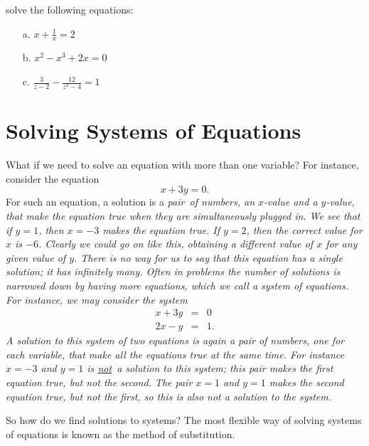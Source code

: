 \begin{question} solve the following equations:
\begin{enumerate}
\item[a.] $x+\frac{1}{x} = 2$ 
\item[b.] $x^2-x^3+2x = 0$
\item[c.] $\frac{3}{z-2} - \frac{12}{z^2-4} = 1$
\end{enumerate}
\end{question}

\section{Solving Systems of Equations}
What if we need to solve an equation with more than one variable? For instance, consider the equation
\[
x+3y  = 0.
\]
For such an equation, a solution is a \it{pair}\ \normalfont of numbers, an $x$-value and a $y$-value, that make the equation true when they are simultaneously plugged in. We see that if $y=1$, then $x=-3$ makes the equation true. If $y=2$, then the correct value for $x$ is $-6$. Clearly we could go on like this, obtaining a different value of $x$ for any given value of $y$. There is no way for us to say that this equation has a single solution; it has infinitely many. Often in problems the number of solutions is narrowed down by having more equations, which we call a \it{system of equations}\normalfont. For instance, we may consider the system
\begin{eqnarray*}
x+3y & = & 0\\
2x-y & = & 1.
\end{eqnarray*}
A solution to this system of two equations is again a pair of numbers, one for each variable, that make all the equations true at the same time. For instance $x=-3$ and $y=1$ is \underline{not}\ \normalfont a solution to this system; this pair makes the first equation true, but not the second. The pair $x=1$ and $y=1$ makes the second equation true, but not the first, so this is also not a solution to the system.

\par 

So how do we find solutions to systems? The most flexible way of solving systems of equations is known as the method of substitution. 

